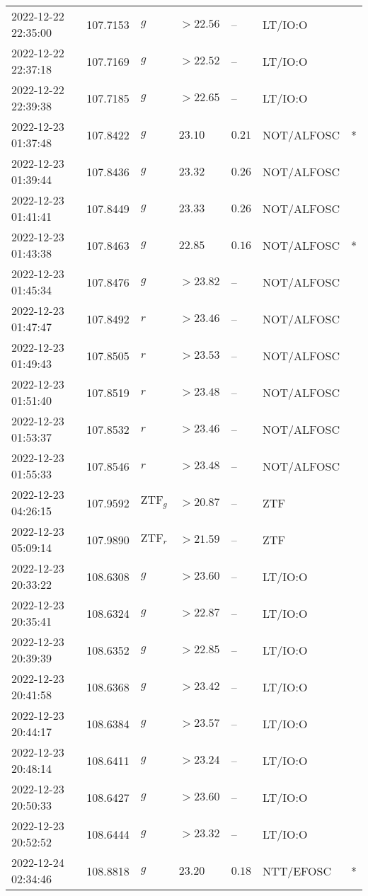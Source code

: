 \documentclass{nature_plusfigure}
\begin{document}
\begin{supplement}
\begin{center}
\begin{longtable}{lllllll}
2022-12-22 22:35:00 & 107.7153 & $g$ & $>22.56$ & -- & LT/IO:O &  \\ 
2022-12-22 22:37:18 & 107.7169 & $g$ & $>22.52$ & -- & LT/IO:O &  \\ 
2022-12-22 22:39:38 & 107.7185 & $g$ & $>22.65$ & -- & LT/IO:O &  \\ 
2022-12-23 01:37:48 & 107.8422 & $g$ & $23.10$ & $0.21$ & NOT/ALFOSC & * \\ 
2022-12-23 01:39:44 & 107.8436 & $g$ & $23.32$ & $0.26$ & NOT/ALFOSC &  \\ 
2022-12-23 01:41:41 & 107.8449 & $g$ & $23.33$ & $0.26$ & NOT/ALFOSC &  \\ 
2022-12-23 01:43:38 & 107.8463 & $g$ & $22.85$ & $0.16$ & NOT/ALFOSC & * \\ 
2022-12-23 01:45:34 & 107.8476 & $g$ & $>23.82$ & -- & NOT/ALFOSC &  \\ 
2022-12-23 01:47:47 & 107.8492 & $r$ & $>23.46$ & -- & NOT/ALFOSC &  \\ 
2022-12-23 01:49:43 & 107.8505 & $r$ & $>23.53$ & -- & NOT/ALFOSC &  \\ 
2022-12-23 01:51:40 & 107.8519 & $r$ & $>23.48$ & -- & NOT/ALFOSC &  \\ 
2022-12-23 01:53:37 & 107.8532 & $r$ & $>23.46$ & -- & NOT/ALFOSC &  \\ 
2022-12-23 01:55:33 & 107.8546 & $r$ & $>23.48$ & -- & NOT/ALFOSC &  \\ 
2022-12-23 04:26:15 & 107.9592 & $\mathrm{ZTF}_{g}$ & $>20.87$ & -- & ZTF &  \\ 
2022-12-23 05:09:14 & 107.9890 & $\mathrm{ZTF}_{r}$ & $>21.59$ & -- & ZTF &  \\ 
2022-12-23 20:33:22 & 108.6308 & $g$ & $>23.60$ & -- & LT/IO:O &  \\ 
2022-12-23 20:35:41 & 108.6324 & $g$ & $>22.87$ & -- & LT/IO:O &  \\ 
2022-12-23 20:39:39 & 108.6352 & $g$ & $>22.85$ & -- & LT/IO:O &  \\ 
2022-12-23 20:41:58 & 108.6368 & $g$ & $>23.42$ & -- & LT/IO:O &  \\ 
2022-12-23 20:44:17 & 108.6384 & $g$ & $>23.57$ & -- & LT/IO:O &  \\ 
2022-12-23 20:48:14 & 108.6411 & $g$ & $>23.24$ & -- & LT/IO:O &  \\ 
2022-12-23 20:50:33 & 108.6427 & $g$ & $>23.60$ & -- & LT/IO:O &  \\ 
2022-12-23 20:52:52 & 108.6444 & $g$ & $>23.32$ & -- & LT/IO:O &  \\ 
2022-12-24 02:34:46 & 108.8818 & $g$ & $23.20$ & $0.18$ & NTT/EFOSC & * \\ 

\end{longtable}
\end{center}
\end{supplement}
\end{document}
